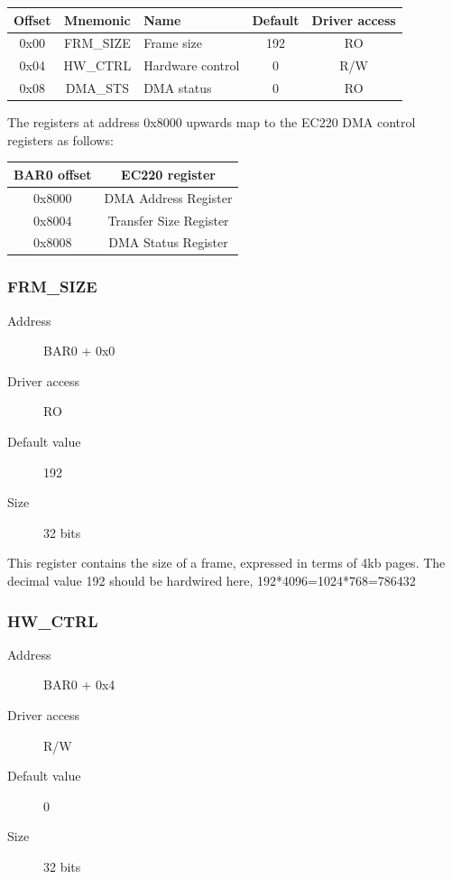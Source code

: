 \documentclass[12pt]{article}
\begin{document}
\begin{tabular}{|c|c|l|c|c|} \hline
\textbf{Offset} & \textbf{Mnemonic} & \textbf{Name} & \textbf{Default} & \textbf{Driver access} \\ \hline
0x00 & FRM\_SIZE & Frame size & 192 & RO \\ \hline
0x04 & HW\_CTRL & Hardware control & 0 & R/W \\ \hline
0x08 & DMA\_STS & DMA status & 0 & RO \\ \hline
\end{tabular}

The registers at address 0x8000 upwards map to the EC220 DMA control registers
as follows:

\begin{tabular}{|c|c|} \hline
\textbf{BAR0 offset} & \textbf{EC220 register} \\ \hline
0x8000 & DMA Address Register \\ \hline
0x8004 & Transfer Size Register \\ \hline
0x8008 & DMA Status Register \\ \hline
\end{tabular}

\subsubsection{FRM\_SIZE}

\begin{description}
\item[Address] BAR0 + 0x0
\item[Driver access] RO
\item[Default value] 192
\item[Size] 32 bits
\end{description}

This register contains the size of a frame, expressed in terms of 4kb pages. The decimal value 192 should be hardwired here, 192*4096=1024*768=786432

\subsubsection{HW\_CTRL}

\begin{description}
\item[Address] BAR0 + 0x4
\item[Driver access] R/W
\item[Default value] 0
\item[Size] 32 bits
\end{description}
\end{document}
